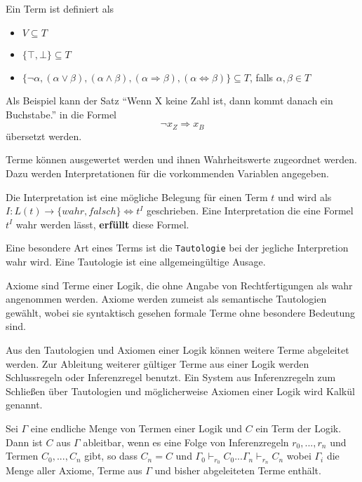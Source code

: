 \begin{defi}
  Ein Term ist definiert als
  \begin{itemize}
  \item $V\subseteq T$
  \item $\{\top,\bot\}\subseteq T$
  \item $\{\neg\alpha,(\alpha\vee\beta),(\alpha\wedge\beta),(\alpha\Rightarrow\beta),(\alpha\Leftrightarrow\beta)\}\subseteq T$, falls $\alpha,\beta\in T$
  \end{itemize}
\end{defi}

Als Beispiel kann der Satz "`Wenn X keine Zahl ist, dann kommt danach ein
Buchstabe."' in die Formel
\[
  \neg x_{Z} \Rightarrow x_{B}
\]
übersetzt werden.

Terme können ausgewertet werden und ihnen Wahrheitswerte zugeordnet werden.
Dazu werden Interpretationen für die vorkommenden Variablen angegeben.

\begin{defi}
  Die Interpretation ist eine mögliche Belegung für einen Term $t$ und
  wird als $I:L(t)\rightarrow \{wahr,falsch\} \Leftrightarrow t^I$ geschrieben.
  Eine Interpretation die eine Formel $t^I$ wahr werden lässt, \textbf{erfüllt}
  diese Formel.
\end{defi}

Eine besondere Art eines Terms ist die \texttt{Tautologie} bei der jegliche
Interpretion wahr wird. Eine Tautologie ist eine allgemeingültige Ausage.

\begin{defi}
  Axiome sind Terme einer Logik, die ohne Angabe von Rechtfertigungen als wahr angenommen
  werden. Axiome werden zumeist als semantische Tautologien gewählt, wobei sie
  syntaktisch gesehen formale Terme ohne besondere Bedeutung sind.
\end{defi}

Aus den Tautologien und Axiomen einer Logik können weitere Terme abgeleitet
werden. Zur Ableitung weiterer gültiger Terme aus einer Logik werden
Schlussregeln oder Inferenzregel benutzt. Ein System aus Inferenzregeln zum
Schließen über Tautologien und möglicherweise Axiomen einer Logik wird Kalkül genannt.

\begin{defi}
  Sei $\Gamma$ eine endliche Menge von Termen einer Logik und $C$ ein Term der Logik.
  Dann ist $C$ aus $\Gamma$ ableitbar, wenn es eine Folge von Inferenzregeln
  $r_0,...,r_n$ und Termen $C_0,...,C_n$ gibt, so dass $C_n = C$ und
  $\Gamma_0\vdash_{r_0}C_0 ... \Gamma_n\vdash_{r_n}C_n$ wobei $\Gamma_i$ die Menge aller Axiome, Terme
  aus $\Gamma$ und bisher abgeleiteten Terme enthält.
\end{defi}



